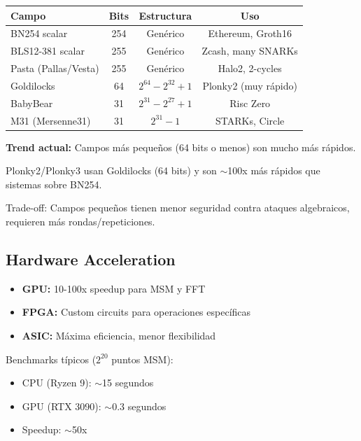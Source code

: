 \documentclass[11pt,a4paper,twoside]{book}
\begin{document}
\begin{center}
\begin{tabular}{lccc}
\toprule
\textbf{Campo} & \textbf{Bits} & \textbf{Estructura} & \textbf{Uso} \\
\midrule
BN254 scalar & 254 & Gen\'erico & Ethereum, Groth16 \\
BLS12-381 scalar & 255 & Gen\'erico & Zcash, many SNARKs \\
Pasta (Pallas/Vesta) & 255 & Gen\'erico & Halo2, 2-cycles \\
Goldilocks & 64 & $2^{64} - 2^{32} + 1$ & Plonky2 (muy r\'apido) \\
BabyBear & 31 & $2^{31} - 2^{27} + 1$ & Risc Zero \\
M31 (Mersenne31) & 31 & $2^{31} - 1$ & STARKs, Circle \\
\bottomrule
\end{tabular}
\end{center}

\begin{keyidea}
\textbf{Trend actual:} Campos m\'as peque\~nos (64 bits o menos) son mucho m\'as r\'apidos.

Plonky2/Plonky3 usan Goldilocks (64 bits) y son $\sim$100x m\'as r\'apidos que sistemas sobre BN254.

Trade-off: Campos peque\~nos tienen menor seguridad contra ataques algebraicos, requieren m\'as rondas/repeticiones.
\end{keyidea}

\subsection{Hardware Acceleration}

\begin{definition}
\begin{itemize}
    \item \textbf{GPU:} 10-100x speedup para MSM y FFT
    \item \textbf{FPGA:} Custom circuits para operaciones espec\'ificas
    \item \textbf{ASIC:} M\'axima eficiencia, menor flexibilidad
\end{itemize}
\end{definition}

Benchmarks t\'ipicos ($2^{20}$ puntos MSM):
\begin{itemize}
    \item CPU (Ryzen 9): $\sim$15 segundos
    \item GPU (RTX 3090): $\sim$0.3 segundos
    \item Speedup: $\sim$50x
\end{itemize}
\end{document}
